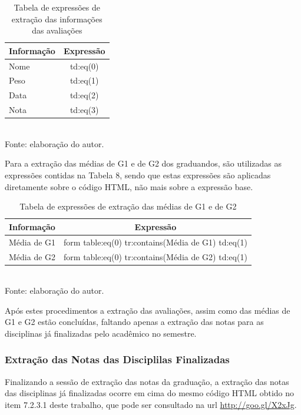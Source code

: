 \begin{table}[!hbt]
\centering
\caption[Extração de Informações - Expressões de Extração]{Tabela de expressões de extração das informações das avaliações}
\vspace{3mm}
\begin{tabular}{p{3cm}|c}\hline
\bf{Informação} & \bf{Expressão} \\ \hline
Nome & td:eq(0)\\ \hline
Peso & td:eq(1)\\ \hline
Data & td:eq(2)\\ \hline
Nota & td:eq(3)\\ \hline
\end{tabular}
\\ Fonte: elaboração do autor.
\end{table}

Para a extração das médias de G1 e de G2 dos graduandos, são utilizadas as expressões contidas na Tabela 8, sendo que estas expressões são aplicadas diretamente sobre o código HTML, não mais sobre a expressão base.

\begin{table}[!hbt]
\centering
\caption[Extração de Informações - Extração das Médias]{Tabela de expressões de extração das médias de G1 e de G2}
\vspace{3mm}
\begin{tabular}{p{3cm}|c}\hline
\bf{Informação} & \bf{Expressão} \\ \hline
Média de G1 & form table:eq(0) tr:contains(Média de G1) td:eq(1)\\ \hline
Média de G2 & form table:eq(0) tr:contains(Média de G2) td:eq(1)\\ \hline
\end{tabular}
\\ Fonte: elaboração do autor.
\end{table}

Após estes procedimentos a extração das avaliações, assim como das médias de G1 e G2 estão concluídas, faltando apenas a extração das notas para as disciplinas já finalizadas pelo acadêmico no semestre.

\subsubsection{Extração das Notas das Disciplilas Finalizadas}
Finalizando a sessão de extração das notas da graduação, a extração das notas das disciplinas já finalizadas ocorre em cima do mesmo código HTML obtido no item 7.2.3.1 deste trabalho, que pode ser consultado na url \url{http://goo.gl/X2xJg}.

